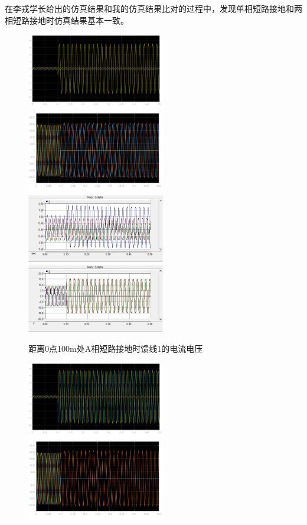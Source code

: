 \documentclass{article}
\begin{document}
{	在李戎学长给出的仿真结果和我的仿真结果比对的过程中，发现单相短路接地和两相短路接地时仿真结果基本一致。
	\begin{figure}[h]
		\centering
		\includegraphics[width=6cm]{figure/4.png}
		\includegraphics[width=6cm]{figure/5.png}
		\includegraphics[width=6cm]{figure/6.png}
		\includegraphics[width=6cm]{figure/7.png}
		\caption{距离0点100m处A相短路接地时馈线1的电流电压}
	\end{figure}
	\begin{figure}[h]
		\centering
		\includegraphics[width=6cm]{figure/8.png}
		\includegraphics[width=6cm]{figure/9.png}

\end{figure}}
\end{document}
